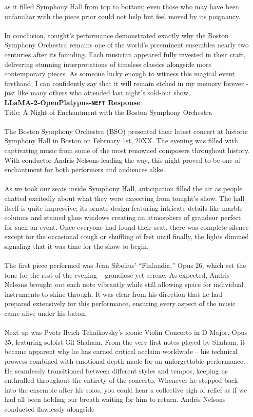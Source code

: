 \documentclass{article} %
\newcommand{\neft}{\texttt{NEFT}}
\newcommand{\llama}{LLaMA}
\begin{document}
\begin{tcolorbox}[breakable,boxrule=0pt]
as it filled Symphony Hall from top to bottom; even those who may have been unfamiliar with the piece prior could not help but feel moved by its poignancy.\\\\In conclusion, tonight's performance demonstrated exactly why the Boston Symphony Orchestra remains one of the world's preeminent ensembles nearly two centuries after its founding. Each musician appeared fully invested in their craft, delivering stunning interpretations of timeless classics alongside more contemporary pieces. As someone lucky enough to witness this magical event firsthand, I can confidently say that it will remain etched in my memory forever - just like many others who attended last night's sold-out show. \\
  \textbf{\llama{}-2-OpenPlatypus-\neft{} Response}: \\Title: A Night of Enchantment with the Boston Symphony Orchestra\\\\The Boston Symphony Orchestra (BSO) presented their latest concert at historic Symphony Hall in Boston on February 1st, 20XX. The evening was filled with captivating music from some of the most renowned composers throughout history. With conductor Andris Nelsons leading the way, this night proved to be one of enchantment for both performers and audiences alike.\\\\As we took our seats inside Symphony Hall, anticipation filled the air as people chatted excitedly about what they were expecting from tonight's show. The hall itself is quite impressive; its ornate design featuring intricate details like marble columns and stained glass windows creating an atmosphere of grandeur perfect for such an event. Once everyone had found their seat, there was complete silence except for the occasional cough or shuffling of feet until finally, the lights dimmed signaling that it was time for the show to begin.\\\\The first piece performed was Jean Sibelius' ``Finlandia,'' Opus 26, which set the tone for the rest of the evening – grandiose yet serene. As expected, Andris Nelsons brought out each note vibrantly while still allowing space for individual instruments to shine through. It was clear from his direction that he had prepared extensively for this performance, ensuring every aspect of the music came alive under his baton.\\\\Next up was Pyotr Ilyich Tchaikovsky's iconic Violin Concerto in D Major, Opus 35, featuring soloist Gil Shaham. From the very first notes played by Shaham, it became apparent why he has earned critical acclaim worldwide – his technical prowess combined with emotional depth made for an unforgettable performance. He seamlessly transitioned between different styles and tempos, keeping us enthralled throughout the entirety of the concerto. Whenever he stepped back into the ensemble after his solos, you could hear a collective sigh of relief as if we had all been holding our breath waiting for him to return. Andris Nelsons conducted flawlessly alongside 
\end{tcolorbox}
\end{document}
